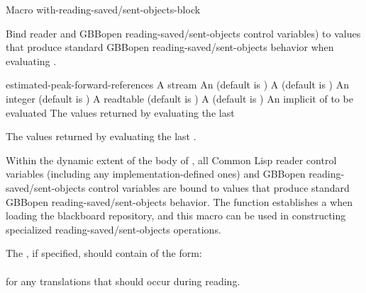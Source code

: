 \documentclass[10pt,twoside,english,pdftex]{article}
\begin{document}
\begin{functiondoc}{Macro}%
  {with-reading-saved/sent-objects-block}%
  {\code{(} 
     \code{)}
    \superstar
    \returns{} \superstar}
  
\fnsyntax

\fnpurpose Bind reader and GBBopen reading-saved/sent-objects control
variables) to values that produce standard GBBopen
reading-saved/sent-objects behavior when evaluating .

\fnpackage {}

\fnmodule {}

\fnargs
\begin{args}{estimated-peak-forward-references}
\arg[stream] A stream
 An  (default is \nil)
 A  (default is \nil)
 An integer (default is
  )
\arg[readtable] A readtable (default is 
  )
 A  (default is \nil)
\arg[forms] An implicit  of  to be evaluated
\arg[results] The values returned by evaluating the last 
\end{args}

\fnreturns The values returned by evaluating the last .

\fndescription Within the dynamic extent of the body of ,
all Common Lisp reader control variables (including any implementation-defined
ones) and GBBopen reading-saved/sent-objects control variables are bound to
values that produce standard GBBopen reading-saved/sent-objects behavior.  The
function  establishes a
 when loading the
blackboard repository, and this macro can be used in constructing specialized
reading-saved/sent-objects operations.

The  , if
specified, should contain  of the form:\\
%
~~~~~~~~\\
%
for any  translations that should occur during reading.


\end{functiondoc}
\end{document}
